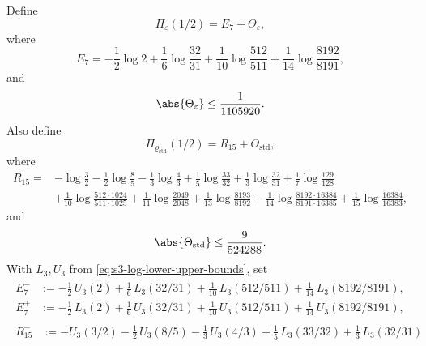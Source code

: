 \begin{lemma}
  \label{lem:appendix-s3-sharp-certificates}
  Define
  \begin{equation}\label{eq:s3-example-epsilon-certificate-sum}
    \Pi_\varepsilon(1/2)=E_7+\Theta_\varepsilon,
  \end{equation}
  where
  \[
    E_7
    =
    -\frac12\log 2
    +\frac16\log\frac{32}{31}
    +\frac1{10}\log\frac{512}{511}
    +\frac1{14}\log\frac{8192}{8191},
  \]
  and
  \begin{equation}\label{eq:s3-example-epsilon-tail-certificate}
    \abs{\Theta_\varepsilon}\le \frac{1}{1105920}.
  \end{equation}
  Also define
  \begin{equation}\label{eq:s3-example-rho-certificate-sum}
    \Pi_{\varrho_{\mathrm{std}}}(1/2)=R_{15}+\Theta_{\mathrm{std}},
  \end{equation}
  where
  \[
  \begin{aligned}
    R_{15}
    ={}&
    -\log\frac32
    -\frac12\log\frac85
    -\frac13\log\frac43
    +\frac15\log\frac{33}{32}
    +\frac13\log\frac{32}{31}
    +\frac17\log\frac{129}{128} \\
    &+\frac1{10}\log\frac{512\cdot 1024}{511\cdot 1025}
    +\frac1{11}\log\frac{2049}{2048}
    +\frac1{13}\log\frac{8193}{8192}
    +\frac1{14}\log\frac{8192\cdot 16384}{8191\cdot 16385}
    +\frac1{15}\log\frac{16384}{16383},
  \end{aligned}
  \]
  and
  \begin{equation}\label{eq:s3-example-rho-tail-certificate}
    \abs{\Theta_{\mathrm{std}}}\le \frac{9}{524288}.
  \end{equation}
  With \(L_3,U_3\) from \eqref{eq:s3-log-lower-upper-bounds}, set
  \begin{equation}\label{eq:s3-example-e7-r15-endpoints}
  \begin{gathered}
  \begin{aligned}
    E_7^-
    &:=
    -\frac12\,U_3(2)
    +\frac16\,L_3(32/31)
    +\frac1{10}\,L_3(512/511)
    +\frac1{14}\,L_3(8192/8191),\\
    E_7^+
    &:=
    -\frac12\,L_3(2)
    +\frac16\,U_3(32/31)
    +\frac1{10}\,U_3(512/511)
    +\frac1{14}\,U_3(8192/8191),
  \end{aligned}\\[0.5ex]
  \begin{aligned}
    R_{15}^-
    &:=
    -U_3(3/2)-\frac12\,U_3(8/5)-\frac13\,U_3(4/3)
    +\frac15\,L_3(33/32)+\frac13\,L_3(32/31)\\

\end{aligned}
\end{gathered}
\end{equation}
\end{lemma}
